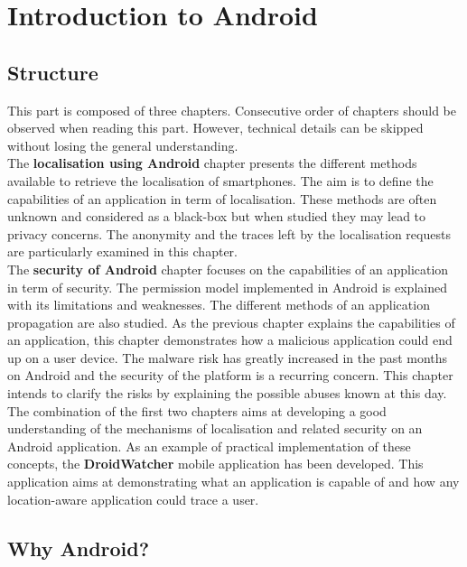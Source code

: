 \chapter{Introduction to Android}
\label{chap:andro-intro}

\section*{Structure}
\label{sec:intro-andro-structure}
This part is composed of three chapters.
Consecutive order of chapters should be observed when reading this part.
However, technical details can be skipped without losing the general understanding.\\

The \textbf{localisation using Android} chapter presents the different methods available to retrieve the localisation of smartphones.
The aim is to define the capabilities of an application in term of localisation.
These methods are often unknown and considered as a black-box but when studied they may lead to privacy concerns.
The anonymity and the traces left by the localisation requests are particularly examined in this chapter.\\

The \textbf{security of Android} chapter focuses on the capabilities of an application in term of security.
The permission model implemented in Android is explained with its limitations and weaknesses.
The different methods of an application propagation are also studied.
As the previous chapter explains the capabilities of an application, this chapter demonstrates how a malicious application could end up on a user device.
The malware risk has greatly increased in the past months on Android and the security of the platform is a recurring concern.
This chapter intends to clarify the risks by explaining the possible abuses known at this day.\\

The combination of the first two chapters aims at developing a good understanding of the mechanisms of localisation and related security on an Android application.
As an example of practical implementation of these concepts, the \textbf{DroidWatcher} mobile application has been developed.
This application aims at demonstrating what an application is capable of and how any location-aware application could trace a user.

\section*{Why Android?}
\label{sec:why-android}

